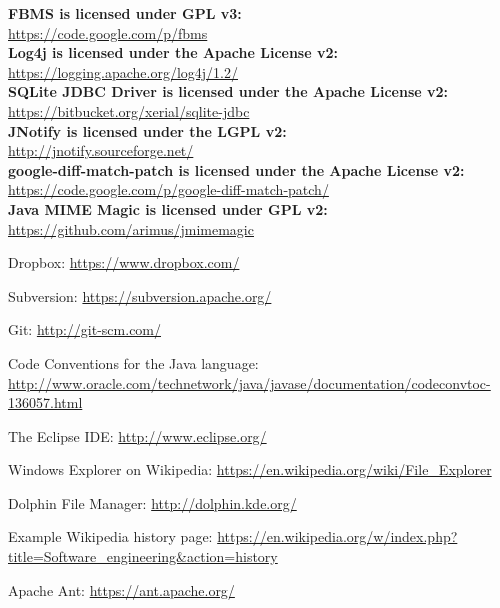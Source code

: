 \documentclass[12pt,a4paper]{article}
\begin{document}
\textbf{FBMS is licensed under GPL v3:} \\
\url{https://code.google.com/p/fbms} \\

\textbf{Log4j is licensed under the Apache License v2:} \\
\url{https://logging.apache.org/log4j/1.2/} \\

\textbf{SQLite JDBC Driver is licensed under the Apache License v2:} \\
\url{https://bitbucket.org/xerial/sqlite-jdbc} \\

\textbf{JNotify is licensed under the LGPL v2:} \\
\url{http://jnotify.sourceforge.net/} \\

\textbf{google-diff-match-patch is licensed under the Apache License v2:} \\
\url{https://code.google.com/p/google-diff-match-patch/} \\

\textbf{Java MIME Magic is licensed under GPL v2:} \\
\url{https://github.com/arimus/jmimemagic}

\begin{thebibliography}{9}

  Dropbox: \url{https://www.dropbox.com/}
  
  Subversion: \url{https://subversion.apache.org/}

  Git: \url{http://git-scm.com/}

  Code Conventions for the Java language: \url{http://www.oracle.com/technetwork/java/javase/documentation/codeconvtoc-136057.html}
  
  The Eclipse IDE: \url{http://www.eclipse.org/}

  Windows Explorer on Wikipedia: \url{https://en.wikipedia.org/wiki/File_Explorer}

  Dolphin File Manager: \url{http://dolphin.kde.org/}
  
  Example Wikipedia history page: \url{https://en.wikipedia.org/w/index.php?title=Software_engineering&action=history}
  
  Apache Ant: \url{https://ant.apache.org/}

\end{thebibliography}
\end{document}
